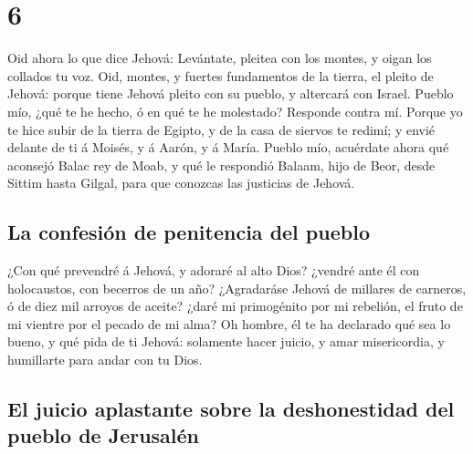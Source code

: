 \hypertarget{section-33-6}{%
\section{6}\label{section-33-6}}

 Oid ahora lo que dice Jehová: Levántate, pleitea con los
montes, y oigan los collados tu voz.  Oid, montes, y
fuertes fundamentos de la tierra, el pleito de Jehová: porque tiene
Jehová pleito con su pueblo, y altercará con Israel. 
Pueblo mío, ¿qué te he hecho, ó en qué te he molestado? Responde contra
mí.  Porque yo te hice subir de la tierra de Egipto, y de
la casa de siervos te redimí; y envié delante de ti á Moisés, y á Aarón,
y á María.  Pueblo mío, acuérdate ahora qué aconsejó Balac
rey de Moab, y qué le respondió Balaam, hijo de Beor, desde Sittim hasta
Gilgal, para que conozcas las justicias de Jehová.

\hypertarget{la-confesiuxf3n-de-penitencia-del-pueblo}{%
\subsection{La confesión de penitencia del
pueblo}\label{la-confesiuxf3n-de-penitencia-del-pueblo}}

 ¿Con qué prevendré á Jehová, y adoraré al alto Dios?
¿vendré ante él con holocaustos, con becerros de un año? 
¿Agradaráse Jehová de millares de carneros, ó de diez mil arroyos de
aceite? ¿daré mi primogénito por mi rebelión, el fruto de mi vientre por
el pecado de mi alma?  Oh hombre, él te ha declarado qué
sea lo bueno, y qué pida de ti Jehová: solamente hacer juicio, y amar
misericordia, y humillarte para andar con tu Dios.

\hypertarget{el-juicio-aplastante-sobre-la-deshonestidad-del-pueblo-de-jerusaluxe9n}{%
\subsection{El juicio aplastante sobre la deshonestidad del pueblo de
Jerusalén}\label{el-juicio-aplastante-sobre-la-deshonestidad-del-pueblo-de-jerusaluxe9n}}

